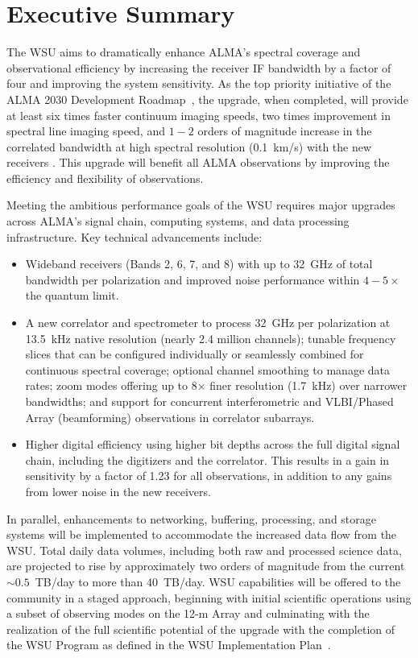 \section*{Executive Summary}


The \ac{WSU} aims to dramatically enhance ALMA’s spectral coverage and observational efficiency by increasing the receiver \ac{IF} bandwidth by a factor of four and improving the system sensitivity. As the top priority initiative of the ALMA 2030 Development Roadmap~\cite{road_map}, the upgrade, when completed, will provide at least six times faster continuum imaging speeds, two times improvement in spectral line imaging speed, and $1-2$ orders of magnitude increase in the correlated bandwidth at high spectral resolution (0.1~km/s) with the new receivers \cite{memo621}. This upgrade will benefit all ALMA observations by improving the efficiency and flexibility of observations.

Meeting the ambitious performance goals of the WSU requires major upgrades across ALMA’s signal chain, computing systems, and data processing infrastructure. Key technical advancements include:
\begin{itemize}[itemsep=-0.5em]
   \item Wideband receivers (Bands 2, 6, 7, and 8) with up to 32~GHz of total bandwidth per polarization and improved noise performance within $4-5\times$ the quantum limit. 
   \item A new correlator and spectrometer to process 32~GHz per polarization at 13.5~kHz native resolution (nearly 2.4 million channels); tunable frequency slices that can be configured individually or seamlessly combined for continuous spectral coverage; optional channel smoothing to manage data rates; zoom modes offering up to 8$\times$ finer resolution (1.7~kHz) over narrower bandwidths; and support for concurrent interferometric and \ac{VLBI}/Phased Array (beamforming) observations in correlator subarrays.
   \item Higher digital efficiency using higher bit depths across the full digital signal chain, including the digitizers and the correlator. This results in a gain in sensitivity by a factor of 1.23 \cite{orig_dig_ef_budget} for all observations, in addition to any gains from lower noise in the new receivers. 
\end{itemize}


In parallel,  enhancements to networking, buffering, processing, and storage systems will be implemented to accommodate the increased data flow from the WSU. Total daily data volumes, including both raw and processed science data, are projected to rise by approximately two orders of magnitude from the current $\sim 0.5$~TB/day to more than 40~TB/day. WSU capabilities will be offered to the community in a staged approach, beginning with initial scientific operations using a subset of observing modes on the 12-m Array %
and culminating with the realization of the full scientific potential of the upgrade with the completion of the WSU Program as defined in
the WSU Implementation Plan~\cite{imp_plan_b}.

